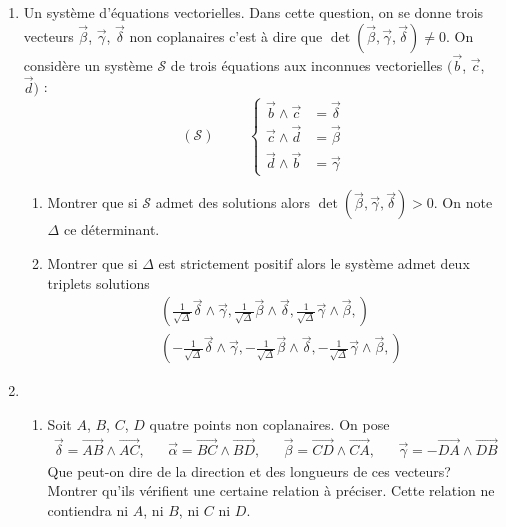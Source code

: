 \begin{enumerate}
\item Un système d'équations vectorielles.\newline 
Dans cette question, on se donne trois vecteurs $\overrightarrow{\beta}$, $\overrightarrow{\gamma}$, $\overrightarrow{\delta}$ non coplanaires c'est à dire que $\det(\overrightarrow{\beta},\overrightarrow{\gamma},\overrightarrow{\delta})\neq0$. On considère un système $\mathcal{S}$ de trois équations aux inconnues vectorielles $(\overrightarrow{b}$, $\overrightarrow{c}$, $\overrightarrow{d})$ :
\begin{displaymath}
 (\mathcal{S})
\hspace{1cm}
\left\lbrace  
\begin{aligned}
 \overrightarrow{b}\wedge \overrightarrow{c} &= \overrightarrow{\delta} \\
 \overrightarrow{c}\wedge \overrightarrow{d} &= \overrightarrow{\beta} \\
 \overrightarrow{d}\wedge \overrightarrow{b} &= \overrightarrow{\gamma}
\end{aligned}
\right. 
\end{displaymath}

\begin{enumerate}
 \item 
Montrer que si $\mathcal{S}$ admet des solutions alors $\det(\overrightarrow{\beta},\overrightarrow{\gamma},\overrightarrow{\delta}) > 0$. On note $\Delta$ ce déterminant.

\item Montrer que si $\Delta$ est strictement positif alors le système admet deux triplets solutions
\begin{align*}
&(
 \frac{1}{\sqrt{\Delta}}\overrightarrow{\delta}\wedge \overrightarrow{\gamma},
 \frac{1}{\sqrt{\Delta}}\overrightarrow{\beta}\wedge \overrightarrow{\delta},
 \frac{1}{\sqrt{\Delta}}\overrightarrow{\gamma}\wedge \overrightarrow{\beta},
)\\
&(
 -\frac{1}{\sqrt{\Delta}}\overrightarrow{\delta}\wedge \overrightarrow{\gamma},
 -\frac{1}{\sqrt{\Delta}}\overrightarrow{\beta}\wedge \overrightarrow{\delta},
 -\frac{1}{\sqrt{\Delta}}\overrightarrow{\gamma}\wedge \overrightarrow{\beta},
)
\end{align*}
\end{enumerate}

\item
\begin{enumerate}
\item Soit $A$, $B$, $C$, $D$ quatre points non coplanaires. On pose 
\begin{align*}
 \overrightarrow{\delta}=\overrightarrow{AB}\wedge \overrightarrow{AC} ,& &
 \overrightarrow{\alpha}=\overrightarrow{BC}\wedge \overrightarrow{BD} ,& &
 \overrightarrow{\beta}=\overrightarrow{CD}\wedge \overrightarrow{CA} ,& &
 \overrightarrow{\gamma}= - \overrightarrow{DA}\wedge \overrightarrow{DB}
\end{align*}
Que peut-on dire de la direction et des longueurs de ces vecteurs? Montrer qu'ils vérifient une certaine relation à préciser. Cette relation ne contiendra ni $A$, ni $B$, ni $C$ ni $D$.


\end{enumerate}
\end{enumerate}
